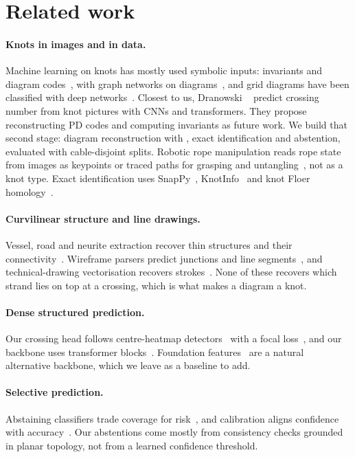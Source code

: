 \section{Related work}\label{sec:related}

\paragraph{Knots in images and in data.} Machine learning on knots has mostly used
symbolic inputs: invariants and diagram codes~\cite{davies2021advancing,davies2022signature},
with graph networks on diagrams~\cite{xu2019powerful}, and grid diagrams have been
classified with deep networks~\cite{kauffman2022rectangular}. Closest to us,
Dranowski \etal~\cite{dranowski2025knotdetection} predict crossing number from
knot pictures with CNNs and transformers. They propose reconstructing PD codes and
computing invariants as future work. We build that second stage: diagram
reconstruction with \ou{}, exact identification and abstention, evaluated with
cable-disjoint splits. Robotic rope manipulation reads rope state from images as
keypoints or traced paths for grasping and
untangling~\cite{nair2017rope,grannen2020untangling,viswanath2023handloom}, not as a
knot type. Exact identification uses SnapPy~\cite{snappy}, KnotInfo~\cite{knotinfo}
and knot Floer homology~\cite{ozsvath2004knotfloer}.

\paragraph{Curvilinear structure and line drawings.} Vessel, road and neurite
extraction recover thin structures and their connectivity~\cite{ronneberger2015unet,bastani2018roadtracer,shit2021cldice}.
Wireframe parsers predict junctions and line segments~\cite{huang2018wireframe,zhou2019lcnn}, and
technical-drawing vectorisation recovers strokes~\cite{egiazarian2020vectorization}.
None of these recovers which strand lies on top at a crossing, which is what makes a
diagram a knot.

\paragraph{Dense structured prediction.} Our crossing head follows centre-heatmap
detectors~\cite{zhou2019objects,newell2016hourglass} with a focal
loss~\cite{lin2017focal}, and our backbone uses transformer
blocks~\cite{dosovitskiy2021vit}. Foundation features~\cite{kirillov2023sam,oquab2024dinov2}
are a natural alternative backbone, which we leave as a baseline to add.

\paragraph{Selective prediction.} Abstaining classifiers trade coverage for
risk~\cite{geifman2017selective}, and calibration aligns confidence with
accuracy~\cite{guo2017calibration}. Our abstentions come mostly from consistency
checks grounded in planar topology, not from a learned confidence threshold.
